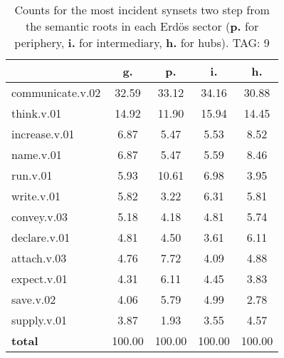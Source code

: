 \begin{table}[h!]
\begin{center}
\begin{tabular}{| l || c | c | c | c |}\hline
 & {\bf g.} & {\bf p.} & {\bf i.} & {\bf h.} \\\hline\hline
communicate.v.02 & 32.59  & 33.12  & 34.16  & 30.88 \\\hline
think.v.01 & 14.92  & 11.90  & 15.94  & 14.45 \\\hline
increase.v.01 & 6.87  & 5.47  & 5.53  & 8.52 \\\hline
name.v.01 & 6.87  & 5.47  & 5.59  & 8.46 \\\hline
run.v.01 & 5.93  & 10.61  & 6.98  & 3.95 \\\hline
write.v.01 & 5.82  & 3.22  & 6.31  & 5.81 \\\hline
convey.v.03 & 5.18  & 4.18  & 4.81  & 5.74 \\\hline
declare.v.01 & 4.81  & 4.50  & 3.61  & 6.11 \\\hline
attach.v.03 & 4.76  & 7.72  & 4.09  & 4.88 \\\hline
expect.v.01 & 4.31  & 6.11  & 4.45  & 3.83 \\\hline
save.v.02 & 4.06  & 5.79  & 4.99  & 2.78 \\\hline
supply.v.01 & 3.87  & 1.93  & 3.55  & 4.57 \\\hline\hline
{{\bf total}} & 100.00  & 100.00  & 100.00  & 100.00 \\\hline
\end{tabular}
\caption{Counts for the most incident synsets two step from the semantic roots in each Erd\"os sector ({\bf p.} for periphery, {\bf i.} for intermediary, {\bf h.} for hubs). TAG: 9}
\end{center}
\end{table}